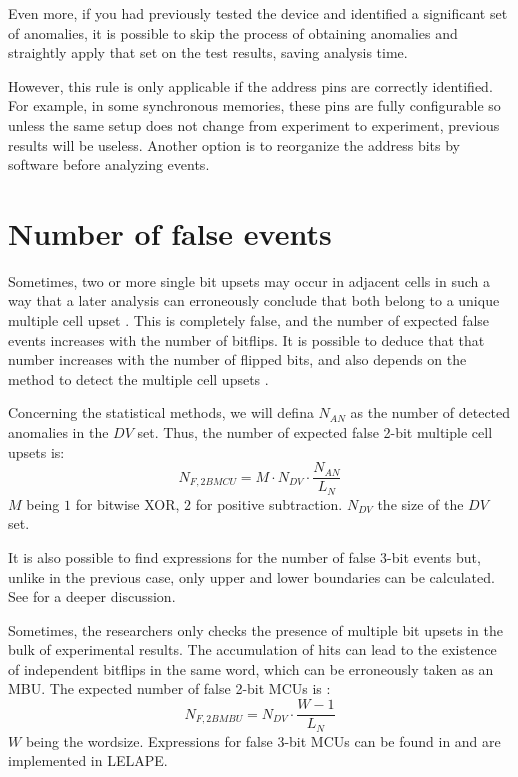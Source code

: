 Even more, if you had previously tested the device and identified a significant set of anomalies, it is possible to skip the process of obtaining anomalies and straightly apply that set on the test results, saving analysis time.

However, this rule is only applicable if the address pins are correctly identified. For example, in some synchronous memories, these pins are fully configurable so unless the same setup does not change from experiment to experiment, previous results will be useless. Another option is to reorganize the address bits by software before analyzing events.
\section{Number of false events}
%
Sometimes, two or more single bit upsets may occur in adjacent cells in such a way that a later analysis can erroneously conclude that both belong to a unique multiple cell upset \cite{Tausch2009}. This is completely false, and the number of expected false events increases with the number of bitflips. It is possible to deduce that that number increases with the number of flipped bits, and also depends on the method to detect the multiple cell upsets \cite{Franco2020}. 

Concerning the statistical methods, we will defina \(N_{AN}\) as the number of detected anomalies in the \(DV\) set. Thus, the number of expected false 2-bit multiple cell upsets is:
%
\begin{equation}
	N_{F,2BMCU} = M\cdot N_{DV}\cdot \frac{N_{AN}}{L_N}
	\label{Eq;False2bitMCU}
\end{equation}
%
\(M\) being \(1\) for bitwise XOR, \(2\) for positive subtraction. \(N_{DV}\) the size of the \(DV\) set.

It is also possible to find expressions for the number of false 3-bit events but, unlike in the previous case, only upper and lower boundaries can be calculated. See \cite{Franco2020} for a deeper discussion. 

Sometimes, the researchers only checks the presence of multiple bit upsets in the bulk of experimental results. The accumulation of hits can lead to the existence of independent bitflips in the same word, which can be erroneously taken  as an MBU. The expected number of false 2-bit MCUs is \cite{Franco2020}:
%
\begin{equation}
	N_{F,2BMBU} = N_{DV}\cdot \frac{W-1}{L_N}
	\label{Eq:False2bitMBU}
\end{equation} 
%
\(W\) being the wordsize. Expressions for false 3-bit MCUs can be found in \cite{Franco2020} and are implemented in LELAPE.